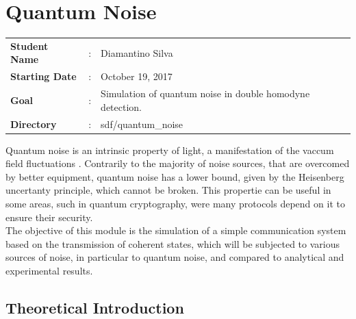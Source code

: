 \clearpage
\section{Quantum Noise}


\begin{tcolorbox}	
\begin{tabular}{p{2.75cm} p{0.2cm} p{10.5cm}}
\textbf{Student Name}  &:& Diamantino Silva\\
\textbf{Starting Date} &:& October 19, 2017\\
\textbf{Goal}          &:& Simulation of quantum noise in double homodyne detection.\\
\textbf{Directory}     &:& sdf/quantum\_noise
\end{tabular}
\end{tcolorbox}
%
\vspace{2em}
%
Quantum noise is an intrinsic property of light, a manifestation of the vaccum field fluctuations
\cite{fox2006}.
Contrarily to the majority of noise sources, that are overcomed by better equipment, quantum noise has a lower bound, given by the Heisenberg uncertanty principle, which cannot be broken. This propertie can be useful in some areas, such in quantum cryptography, were many protocols depend on it to ensure their security.\\ 
The objective of this module is the simulation of a simple communication system based on the transmission of coherent states, which will be subjected to various sources of noise, in particular to quantum noise, and compared to analytical and experimental results.\\


\subsection{Theoretical Introduction}\label{sec:intro}

